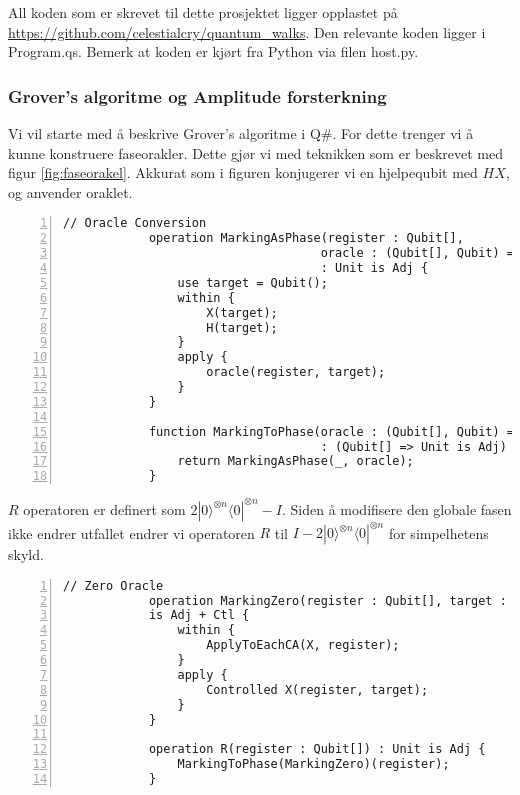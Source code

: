         All koden som er skrevet til dette prosjektet ligger opplastet på \url{https://github.com/celestialcry/quantum_walks}. Den relevante koden ligger i Program.qs. Bemerk at koden er kjørt fra Python via filen host.py.

    \subsubsection{Grover's algoritme og Amplitude forsterkning}
    
        Vi vil starte med å beskrive Grover's algoritme i Q\#. For dette trenger vi å kunne konstruere faseorakler. Dette gjør vi med teknikken som er beskrevet med figur \ref{fig:faseorakel}. Akkurat som i figuren konjugerer vi en hjelpequbit med $HX$, og anvender oraklet.
        
        \begin{Verbatim}[gobble=2, numbers=left, frame=lines,
            framesep=3mm,
            label={[Beginning of code]End of code}]
            // Oracle Conversion
            operation MarkingAsPhase(register : Qubit[], 
                                    oracle : (Qubit[], Qubit) => Unit is Adj) 
                                    : Unit is Adj {
                use target = Qubit();
                within {
                    X(target);
                    H(target);
                }
                apply {
                    oracle(register, target);
                }
            }

            function MarkingToPhase(oracle : (Qubit[], Qubit) => Unit is Adj) 
                                    : (Qubit[] => Unit is Adj) {
                return MarkingAsPhase(_, oracle);
            }
        \end{Verbatim}

        
        $R$ operatoren er definert som $2|0\rangle^{\otimes n}\langle 0|^{\otimes n} - I$. Siden å modifisere den globale fasen ikke endrer utfallet endrer vi operatoren $R$ til $I - 2|0\rangle^{\otimes n}\langle 0|^{\otimes n}$ for simpelhetens skyld.

        \begin{Verbatim}[gobble=2, numbers=left, frame=lines,
            framesep=3mm,
            label={[Beginning of code]End of code}]
            // Zero Oracle
            operation MarkingZero(register : Qubit[], target : Qubit) : Unit
            is Adj + Ctl {
                within {
                    ApplyToEachCA(X, register);
                }
                apply {
                    Controlled X(register, target);
                }
            }

            operation R(register : Qubit[]) : Unit is Adj {
                MarkingToPhase(MarkingZero)(register);
            }
        \end{Verbatim}

